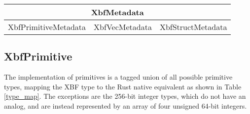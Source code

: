 \documentclass[conference]{IEEEtran}
\begin{document}
\begin{table}[htbp]
	\begin{center}
		\begin{tabular}{|c|c|c|}
			\hline
			\multicolumn{3}{|c|}{XbfMetadata}                         \\
			\hline
			XbfPrimitiveMetadata & XbfVecMetadata & XbfStructMetadata \\
			\hline
		\end{tabular}
	\end{center}
\end{table}

\subsection{XbfPrimitive}\label{primitives}

The implementation of primitives is a tagged union of all possible primitive types, mapping the XBF type to the Rust native equivalent as shown in Table \ref{type_map}. The exceptions are the 256-bit integer types, which do not have an analog, and are instead represented by an array of four unsigned 64-bit integers.
\end{document}

